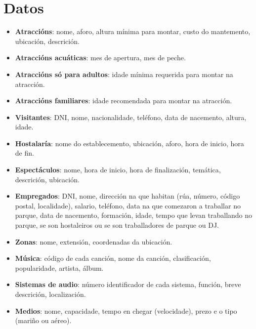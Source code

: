 \documentclass[12pt,a4paper]{book}
\theoremstyle{definition}
\theoremstyle{break}
\begin{document}
\section{Datos}
\begin{itemize}
  \item \textbf{Atraccións}: nome, aforo, altura mínima para montar, custo do mantemento, ubicación, descrición.
  
  \item \textbf{Atraccións acuáticas}: mes de apertura, mes de peche.
  
  \item \textbf{Atraccións só para adultos}: idade mínima requerida para montar na atracción.
  
  \item \textbf{Atraccións familiares}: idade recomendada para montar na atracción.

  \item \textbf{Visitantes}: DNI, nome, nacionalidade, teléfono, data de nacemento, altura, idade.

  \item \textbf{Hostalaría}: nome do establecemento, ubicación, aforo, hora de inicio, hora de fin.

  \item \textbf{Espectáculos}: nome, hora de inicio, hora de finalización, temática, descrición, ubicación.

  \item \textbf{Empregados}: DNI, nome, dirección na que habitan (rúa, número, código postal, localidade), salario, teléfono, data na que comezaron a traballar no parque, data de nacemento, formación, idade, tempo que levan traballando no parque, se son hostaleiros ou se son traballadores de parque ou DJ.
  
  \item \textbf{Zonas}: nome, extensión, coordenadas da ubicación.
  
  \item \textbf{Música}: código de cada canción, nome da canción, clasificación, popularidade, artista, álbum.
  
  \item \textbf{Sistemas de audio}: número identificador de cada sistema, función, breve
  descrición, localización.
  
  \item \textbf{Medios}: nome, capacidade, tempo en chegar (velocidade), prezo e o tipo (mariño ou aéreo).
\end{itemize}
\end{document}
